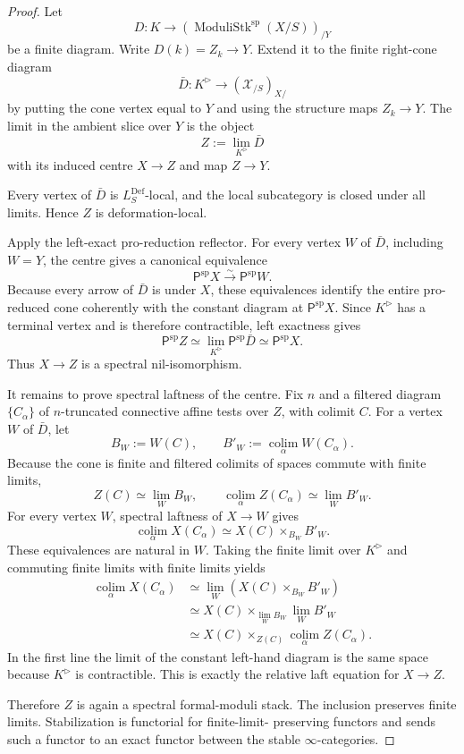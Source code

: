 \begin{proof}
Let
\[
    D:K\longrightarrow
    \left(\operatorname{ModuliStk}^{\mathrm{sp}}(X/S)\right)_{/Y}
\]
be a finite diagram.  Write $D(k)=Z_k\to Y$.  Extend it to the finite
right-cone diagram
\[
    \bar D:K^\triangleright\longrightarrow(\mathcal X_{/S})_{X/}
\]
by putting the cone vertex equal to $Y$ and using the structure maps
$Z_k\to Y$.  The limit in the ambient slice over $Y$ is the object
\[
\boxed{
    Z:=\lim_{K^\triangleright}\bar D}
\]
with its induced centre $X\to Z$ and map $Z\to Y$.

Every vertex of $\bar D$ is $L_S^{\mathrm{Def}}$-local, and the local
subcategory is closed under all limits.  Hence $Z$ is deformation-local.

Apply the left-exact pro-reduction reflector.  For every vertex $W$ of
$\bar D$, including $W=Y$, the centre gives a canonical equivalence
\[
    \mathsf P^{\mathrm{sp}}X\xrightarrow{\sim}\mathsf P^{\mathrm{sp}}W.
\]
Because every arrow of $\bar D$ is under $X$, these equivalences identify the
entire pro-reduced cone coherently with the constant diagram at
$\mathsf P^{\mathrm{sp}}X$.  Since $K^\triangleright$ has a terminal vertex
and is therefore contractible, left exactness gives
\[
\boxed{
    \mathsf P^{\mathrm{sp}}Z
    \simeq
    \lim_{K^\triangleright}\mathsf P^{\mathrm{sp}}\bar D
    \simeq
    \mathsf P^{\mathrm{sp}}X.}
\]
Thus $X\to Z$ is a spectral nil-isomorphism.

It remains to prove spectral laftness of the centre.  Fix $n$ and a filtered
diagram $\{C_\alpha\}$ of $n$-truncated connective affine tests over $Z$, with
colimit $C$.  For a vertex $W$ of $\bar D$, let
\[
    B_W:=W(C),
    \qquad
    B'_W:=\operatorname*{colim}_\alpha W(C_\alpha).
\]
Because the cone is finite and filtered colimits of spaces commute with finite
limits,
\[
    Z(C)\simeq\lim_W B_W,
    \qquad
    \operatorname*{colim}_\alpha Z(C_\alpha)
    \simeq
    \lim_W B'_W.
\]
For every vertex $W$, spectral laftness of $X\to W$ gives
\[
\boxed{
    \operatorname*{colim}_\alpha X(C_\alpha)
    \simeq
    X(C)\times_{B_W}B'_W.}
\]
These equivalences are natural in $W$.  Taking the finite limit over
$K^\triangleright$ and commuting finite limits with finite limits yields
\[
\begin{aligned}
    \operatorname*{colim}_\alpha X(C_\alpha)
    &\simeq
    \lim_W\left(X(C)\times_{B_W}B'_W\right)\\
    &\simeq
    X(C)\times_{\lim_WB_W}\lim_WB'_W\\
    &\simeq
    X(C)\times_{Z(C)}
    \operatorname*{colim}_\alpha Z(C_\alpha).
\end{aligned}
\]
In the first line the limit of the constant left-hand diagram is the same
space because $K^\triangleright$ is contractible.  This is exactly the
relative laft equation for $X\to Z$.

Therefore $Z$ is again a spectral formal-moduli stack.  The inclusion
preserves finite limits.  Stabilization is functorial for finite-limit-
preserving functors and sends such a functor to an exact functor between the
stable $\infty$-categories.
\end{proof}

